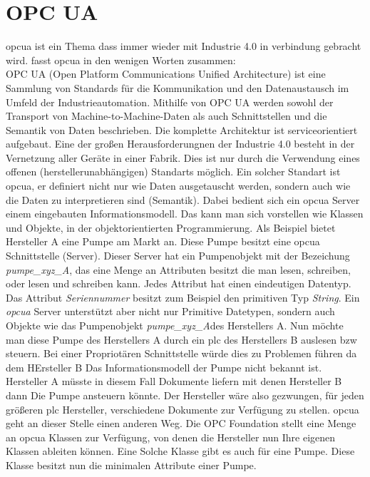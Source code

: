 \section{OPC UA}
\ac{opcua} ist ein Thema dass immer wieder mit Industrie 4.0 in verbindung gebracht wird.
\citet{opcua:2018} fasst \acs{opcua} in den wenigen  Worten zusammen:\\
\flqq OPC UA (Open Platform Communications Unified Architecture) ist eine Sammlung von Standards 
für die Kommunikation und den Datenaustausch im Umfeld der Industrieautomation. 
Mithilfe von OPC UA werden sowohl der Transport von Machine-to-Machine-Daten 
als auch Schnittstellen und die Semantik von Daten beschrieben. 
Die komplette Architektur ist serviceorientiert aufgebaut.\frqq
Eine der großen Herausforderungnen der Industrie 4.0 besteht in der Vernetzung aller Geräte in einer Fabrik.
Dies ist nur durch die Verwendung eines offenen (herstellerunabhängigen) Standarts möglich.
Ein solcher Standart ist \ac{opcua}, er definiert nicht nur wie Daten ausgetauscht werden, 
sondern auch wie die Daten zu interpretieren sind (Semantik).
Dabei bedient sich ein \ac{opcua} Server einem eingebauten Informationsmodell. 
Das kann man sich vorstellen wie Klassen und Objekte, in der objektorientierten Programmierung.
Als Beispiel bietet Hersteller A eine Pumpe am Markt an. 
Diese Pumpe besitzt eine \ac{opcua} Schnittstelle (Server).
Dieser Server hat ein Pumpenobjekt mit der Bezeichung \flqq \emph{pumpe\_xyz\_A}\frqq, das eine Menge an Attributen besitzt die man lesen, schreiben, oder lesen und schreiben kann.
Jedes Attribut hat einen eindeutigen Datentyp. 
Das Attribut \emph{Seriennummer} besitzt zum Beispiel den primitiven Typ \emph{String}.
Ein \emph{opcua} Server unterstützt aber nicht nur Primitive Datetypen, 
sondern auch Objekte wie das Pumpenobjekt \flqq \emph{pumpe\_xyz\_A}\frqq{}des Herstellers A.
Nun möchte man diese Pumpe des Herstellers A durch ein \ac{plc} des Herstellers B auslesen bzw steuern.
Bei einer Propriotären Schnittstelle würde dies zu Problemen führen da dem HErsteller B Das Informationsmodell der Pumpe nicht bekannt ist. 
Hersteller A müsste in diesem Fall Dokumente liefern mit denen Hersteller B dann Die Pumpe ansteuern könnte.
Der Hersteller wäre also gezwungen, für jeden größeren \ac{plc} Hersteller, verschiedene Dokumente zur Verfügung zu stellen.
\ac{opcua} geht an dieser Stelle einen anderen Weg. 
Die OPC Foundation stellt eine Menge an \ac{opcua} Klassen zur Verfügung, 
von denen die Hersteller nun Ihre eigenen Klassen ableiten können.
Eine Solche Klasse gibt es auch für eine Pumpe. Diese Klasse besitzt nun die minimalen Attribute einer Pumpe.

